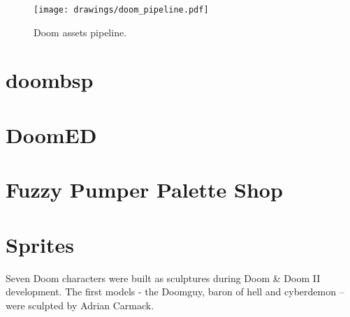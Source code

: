 
\begin{figure}[H]
\centering
\texttt{[image: drawings/doom\_pipeline.pdf]}
\caption{Doom assets pipeline.}
\end{figure}
\par

\section{doombsp}
\par
{}
\par


\section{DoomED}
\section{Fuzzy Pumper Palette Shop}
\section{Sprites}

Seven Doom characters were built as sculptures during Doom \& Doom II development. The first models - the Doomguy, baron of hell and cyberdemon -- were sculpted by Adrian Carmack. 

\\
\par
{}\\

